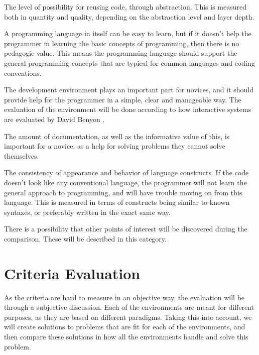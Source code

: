 \begin{description}[style=nextline]
\item[Reusability] The level of possibility for reusing code, through abstraction. This is measured both in quantity and quality, depending on the abstraction level and layer depth.
\item[Pedagogic Value] A programming language in itself can be easy to learn, but if it doesn't help the programmer in learning the basic concepts of programming, then there is no pedagogic value. This means the programming language should support the general programming concepts that are typical for common languages and coding conventions.
\item[Environment] The development environment plays an important part for novices, and it should provide help for the programmer in a simple, clear and manageable way. The evaluation of the environment will be done according to how interactive systems are evaluated by David Benyon \cite[p. 225-250]{design_book}.
\item[Documentation] The amount of documentation, as well as the informative value of this, is important for a novice, as a help for solving problems they cannot solve themselves.
\item[Uniformity] The consistency of appearance and behavior of language constructs. If the code doesn't look like any conventional language, the programmer will not learn the general approach to programming, and will have trouble moving on from this language. This is measured in terms of constructs being similar to known syntaxes, or preferably written in the exact same way.
\item[Miscellaneous] There is a possibility that other points of interest will be discovered during the comparison. These will be described in this category.
\end{description}


\section{Criteria Evaluation}
As the criteria are hard to measure in an objective way, the evaluation will be through a subjective discussion. Each of the environments are meant for different purposes, as they are based on different paradigms. Taking this into account, we will create solutions to problems that are fit for each of the environments, and then compare these solutions in how all the environments handle and solve this problem.